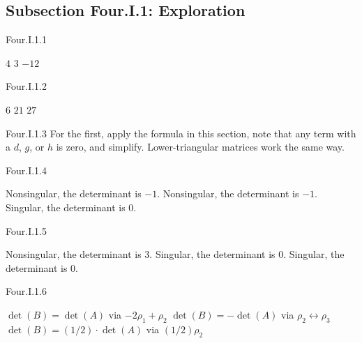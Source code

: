 \subsection{Subsection Four.I.1: Exploration}
\begin{ans}{Four.I.1.1}
       \begin{exparts*}
         \partsitem \( 4 \)
         \partsitem \( 3 \)
         \partsitem \( -12 \)
       \end{exparts*}
     
\end{ans}
\begin{ans}{Four.I.1.2}
      \begin{exparts*}
        \partsitem \( 6 \)
        \partsitem \( 21 \)
        \partsitem \( 27 \)
      \end{exparts*}
    
\end{ans}
\begin{ans}{Four.I.1.3}
      For the first, apply the formula in this section, note that any
      term with a \( d \), \( g \), or \( h \) is zero, and simplify.
      Lower-triangular matrices work the same way.
    
\end{ans}
\begin{ans}{Four.I.1.4}
       \begin{exparts}
         \partsitem Nonsingular, the determinant is \( -1 \).
         \partsitem Nonsingular, the determinant is \( -1 \).
         \partsitem Singular, the determinant is \( 0 \).
       \end{exparts}
     
\end{ans}
\begin{ans}{Four.I.1.5}
      \begin{exparts}
         \partsitem Nonsingular, the determinant is \( 3 \).
         \partsitem Singular, the determinant is \( 0 \).
         \partsitem Singular, the determinant is \( 0 \).
       \end{exparts}
     
\end{ans}
\begin{ans}{Four.I.1.6}
       \begin{exparts}
         \partsitem \( \det(B)=\det(A) \) via \( -2\rho_1+\rho_2 \)
         \partsitem \( \det(B)=-\det(A) \) via
             \( \rho_2\leftrightarrow\rho_3 \)
         \partsitem \( \det(B)=(1/2)\cdot \det(A) \) via \( (1/2)\rho_2 \)
       \end{exparts}
     
\end{ans}
